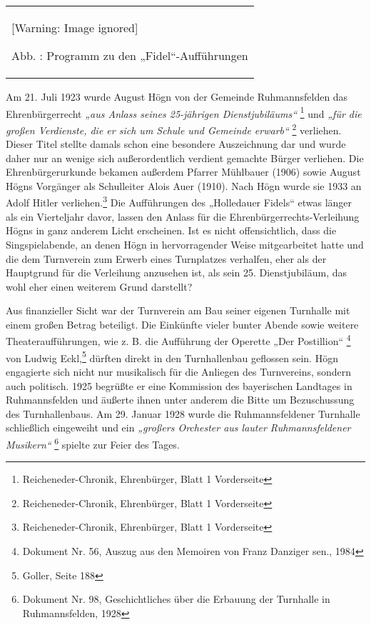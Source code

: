 \documentclass[a4paper]{article}
\newcommand\textstyleZitate[1]{\textit{#1}}
\newcommand\textstyleFunotenTextZchn[1]{#1}
\newcounter{Abb}
\renewcommand\theAbb{\arabic{Abb}}
\begin{document}
\begin{center}
\begin{minipage}{5.794cm}
\begin{center}
\tablefirsthead{}
\tablehead{}
\tabletail{}
\tablelasttail{}
\begin{supertabular}{m{5.5940003cm}}
  [Warning: Image ignored] %
 
Abb. \stepcounter{Abb}{\theAbb}: Programm zu den „Fidel“-Aufführungen\\
\end{supertabular}
\end{center}
\end{minipage}
\end{center}
Am 21. Juli 1923 wurde August Högn von der Gemeinde Ruhmannsfelden das
Ehrenbürgerrecht \textstyleZitate{„aus Anlass seines 25-jährigen
Dienstjubiläums“ }\footnote{
\textstyleFunotenTextZchn{Reicheneder-Chronik, Ehrenbürger, Blatt 1
Vorderseite}} und \textstyleZitate{„für die großen Verdienste, die er
sich um Schule und Gemeinde erwarb“ }\footnote{
\textstyleFunotenTextZchn{Reicheneder-Chronik, Ehrenbürger, Blatt 1
Vorderseite}} verliehen. Dieser Titel stellte damals schon eine
besondere Auszeichnung dar und wurde daher nur an wenige sich
außerordentlich verdient gemachte Bürger verliehen. Die
Ehrenbürgerurkunde bekamen außerdem Pfarrer Mühlbauer (1906) sowie
August Högns Vorgänger als Schulleiter Alois Auer (1910). Nach Högn
wurde sie 1933 an Adolf Hitler verliehen.\footnote{
\textstyleFunotenTextZchn{Reicheneder-Chronik, Ehrenbürger, Blatt 1
Vorderseite}} Die Aufführungen des „Holledauer Fidels“ etwas länger als
ein Vierteljahr davor, lassen den Anlass für die
Ehrenbürgerrechts-Verleihung Högns in ganz anderem Licht erscheinen.
Ist es nicht offensichtlich, dass die Singspielabende, an denen Högn in
hervorragender Weise mitgearbeitet hatte und die dem Turnverein zum
Erwerb eines Turnplatzes verhalfen, eher als der Hauptgrund für die
Verleihung anzusehen ist, als sein 25. Dienstjubiläum, das wohl eher
einen weiterem Grund darstellt?

Aus finanzieller Sicht war der Turnverein am Bau seiner eigenen
Turnhalle mit einem großen Betrag beteiligt. Die Einkünfte vieler
bunter Abende sowie weitere Theateraufführungen, wie z. B. die
Aufführung der Operette „Der Postillion“ \footnote{ Dokument Nr. 56,
Auszug aus den Memoiren von Franz Danziger sen., 1984} von Ludwig
Eckl,\footnote{ Goller, Seite 188} dürften direkt in den Turnhallenbau
geflossen sein. Högn engagierte sich nicht nur musikalisch für die
Anliegen des Turnvereins, sondern auch politisch. 1925 begrüßte er eine
Kommission des bayerischen Landtages in Ruhmannsfelden und äußerte
ihnen unter anderem die Bitte um Bezuschussung des Turnhallenbaus. Am
29. Januar 1928 wurde die Ruhmannsfeldener Turnhalle schließlich
eingeweiht und ein \textstyleZitate{„großers Orchester aus lauter
Ruhmannsfeldener Musikern“ }\footnote{ Dokument Nr. 98, Geschichtliches
über die Erbauung der Turnhalle in Ruhmannsfelden, 1928} spielte zur
Feier des Tages.
\end{document}
